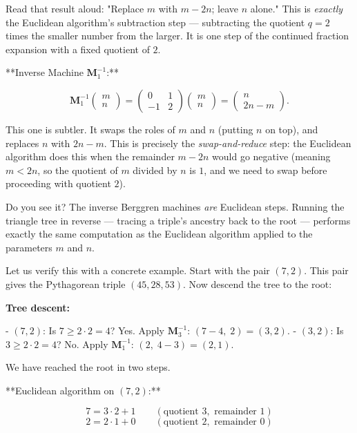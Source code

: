 \documentclass[12pt, letterpaper, openany]{book}
\theoremstyle{definition}
\theoremstyle{remark}
\begin{document}
Read that result aloud: "Replace $m$ with $m - 2n$; leave $n$ alone." This is \textit{exactly} the Euclidean algorithm's subtraction step --- subtracting the quotient $q = 2$ times the smaller number from the larger. It is one step of the continued fraction expansion with a fixed quotient of $2$.

**Inverse Machine $\mathbf{M}_1^{-1}$:**

\[
\mathbf{M}_1^{-1} \begin{pmatrix} m \\ n \end{pmatrix} = \begin{pmatrix} 0 & 1 \\ -1 & 2 \end{pmatrix} \begin{pmatrix} m \\ n \end{pmatrix} = \begin{pmatrix} n \\ 2n - m \end{pmatrix}.
\]

This one is subtler. It swaps the roles of $m$ and $n$ (putting $n$ on top), and replaces $n$ with $2n - m$. This is precisely the \textit{swap-and-reduce} step: the Euclidean algorithm does this when the remainder $m - 2n$ would go negative (meaning $m < 2n$, so the quotient of $m$ divided by $n$ is $1$, and we need to swap before proceeding with quotient $2$).

Do you see it? The inverse Berggren machines \textit{are} Euclidean steps. Running the triangle tree in reverse --- tracing a triple's ancestry back to the root --- performs exactly the same computation as the Euclidean algorithm applied to the parameters $m$ and $n$.

Let us verify this with a concrete example. Start with the pair $(7, 2)$. This pair gives the Pythagorean triple $(45, 28, 53)$. Now descend the tree to the root:

\textbf{Tree descent:}

- $(7, 2)$: Is $7 \ge 2 \cdot 2 = 4$? Yes. Apply $\mathbf{M}_3^{-1}$: $(7 - 4,\; 2) = (3, 2)$.
- $(3, 2)$: Is $3 \ge 2 \cdot 2 = 4$? No. Apply $\mathbf{M}_1^{-1}$: $(2,\; 4 - 3) = (2, 1)$.

We have reached the root in two steps.

**Euclidean algorithm on $(7, 2)$:**

\[
7 = 3 \cdot 2 + 1 \qquad (\text{quotient } 3, \text{ remainder } 1)
\]
\[
2 = 2 \cdot 1 + 0 \qquad (\text{quotient } 2, \text{ remainder } 0)
\]
\end{document}
